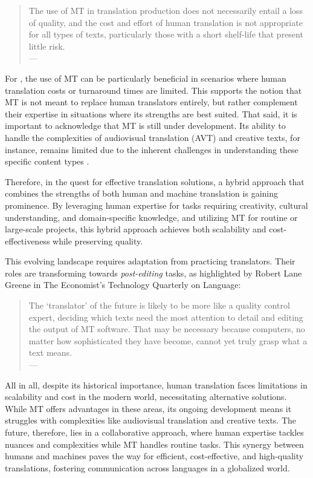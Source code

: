 \begin{quote}
The use of MT in translation production does not necessarily entail a loss of quality, and the cost and effort of human translation is not appropriate for all types of texts, particularly those with a short shelf-life that present little risk. \\
\phantom{abc} \hfill --- \textcite[129-130]{kenny2022human}
\end{quote}

For \textcite{kenny2022human}, the use of MT can be particularly beneficial in scenarios where human translation costs or turnaround times are limited. This supports the notion that MT is not meant to replace human translators entirely, but rather complement their expertise in situations where its strengths are best suited. That said, it is important to acknowledge that MT is still under development. Its ability to handle the complexities of audiovisual translation (AVT) and creative texts, for instance, remains limited due to the inherent challenges in understanding these specific content types \parencite{Burchardt2016}.

Therefore, in the quest for effective translation solutions, a hybrid approach that combines the strengths of both human and machine translation is gaining prominence. By leveraging human expertise for tasks requiring creativity, cultural understanding, and domain-specific knowledge, and utilizing MT for routine or large-scale projects, this hybrid approach achieves both scalability and cost-effectiveness while preserving quality.

This evolving landscape requires adaptation from practicing translators. Their roles are transforming towards \emph{post-editing} tasks, as highlighted by Robert Lane Greene in The Economist's Technology Quarterly on Language:

\begin{quote}
The ‘translator’ of the future is likely to be more like a quality control expert, deciding which texts need the most attention to detail and editing the output of MT software. That may be necessary because computers, no matter how sophisticated they have become, cannot yet truly grasp what a text means.\\
\phantom{abc} \hfill --- \textcite{economist2017}
\end{quote}

All in all, despite its historical importance, human translation faces limitations in scalability and cost in the modern world, necessitating alternative solutions. While MT offers advantages in these areas, its ongoing development means it struggles with complexities like audiovisual translation and creative texts. The future, therefore, lies in a collaborative approach, where human expertise tackles nuances and complexities while MT handles routine tasks. This synergy between humans and machines paves the way for efficient, cost-effective, and high-quality translations, fostering communication across languages in a globalized world.


